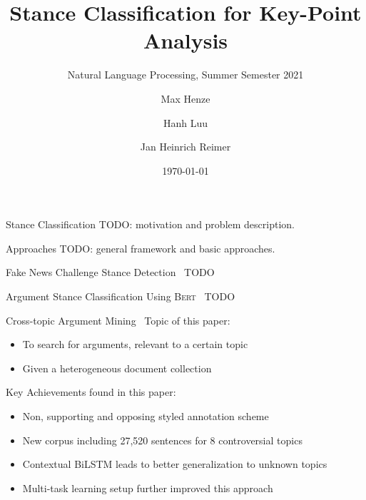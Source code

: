 \documentclass[english,handout]{mlutalk}
\title{Stance Classification for Key-Point Analysis}
\subtitle{Natural Language Processing, Summer Semester 2021}
\author{Max Henze \and Hanh Luu \and Jan Heinrich Reimer}
\institute{Martin Luther University Halle-Wittenberg}
\date{\today}
\newcommand{\Bert}{\textsc{Bert}\xspace}
\begin{document}
\titleframe

\begin{frame}{Stance Classification}
  TODO: motivation and problem description.
\end{frame}

\begin{frame}{Approaches}
  TODO: general framework and basic approaches.
\end{frame}

\begin{frame}{Fake News Challenge Stance Detection~\cite{HanselowskiSSCC2018}}
  TODO
\end{frame}

\begin{frame}{Argument Stance Classification Using \Bert~\cite{OllingerDSBS2020}}
  TODO
\end{frame}

\begin{frame}{Cross-topic Argument Mining~\cite{StabMSRG2018}}
  Topic of this paper:
  \begin{itemize}
    \item To search for arguments, relevant to a certain topic 
    \item Given a heterogeneous document collection
  \end{itemize}
  Key Achievements found in this paper:
  \begin{itemize}
    \item Non, supporting and opposing styled annotation scheme
    \item New corpus including 27,520 sentences for 8 controversial topics
    \item Contextual BiLSTM leads to better generalization to unknown topics
    \item Multi-task learning setup further improved this approach 
  \end{itemize}
\end{frame}
\end{document}
